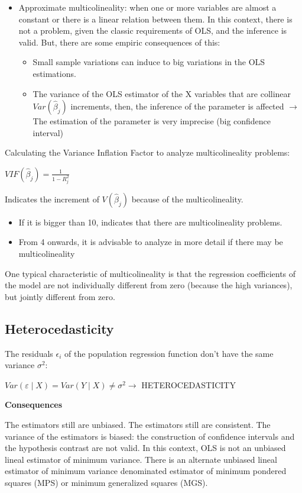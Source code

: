 \documentclass[10pt,landscape]{article}
\begin{document}
\begin{multicols}{3}
\begin{itemize}
\item Approximate multicolineality: when one or more variables are almost a constant or there is a linear relation between them. In this context, there is not a problem, given the classic requirements of OLS, and the inference is valid. But, there are some empiric consequences of this:
\begin{itemize}
\item Small sample variations can induce to big variations in the OLS estimations.
\item The variance of the OLS estimator of the X variables that are collinear $Var(\hat{\beta}_j)$ increments, then, the inference of the parameter is affected $\rightarrow$ The estimation of the parameter is very imprecise (big confidence interval)
\end{itemize}

\end{itemize}

Calculating the Variance Inflation Factor to analyze multicolineality problems:

$VIF(\hat{\beta}_j) = \frac{1}{1-R_j^2}$

Indicates the increment of $V(\hat{\beta}_j)$ because of the multicolineality.

\begin{itemize}
\item If it is bigger than 10, indicates that there are multicolineality problems.
\item From 4 onwards, it is advisable to analyze in more detail if there may be
multicolineality
\end{itemize}

One typical characteristic of multicolineality is that the regression coefficients of the model are not individually different from zero (because the high variances), but jointly different from zero.

\subsection*{Heterocedasticity}

The residuals $\epsilon_i$ of the population regression function don't have the same variance $\sigma^2$:

$Var(\varepsilon \mid X) = Var(Y \mid X) \neq \sigma^2 \rightarrow$ HETEROCEDASTICITY

\textbf{Consequences}

The estimators still are unbiased.
The estimators still are consistent.
The variance of the estimators is biased: the construction of confidence intervals and the hypothesis contrast are not valid.
In this context, OLS is not an unbiased lineal estimator of minimum variance. There is an alternate unbiased lineal estimator of minimum variance denominated estimator of minimum pondered squares (MPS) or minimum generalized squares (MGS).


\end{multicols}
\end{document}
